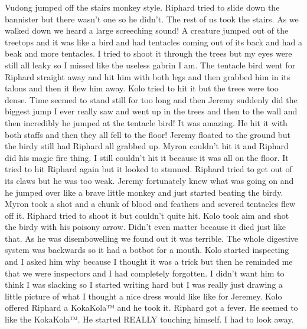 \begin{multicols}{2}
Vudong jumped off the stairs monkey style. Riphard tried to slide down the bannister but there wasn’t one so he didn’t. The rest of us took the stairs. As we walked down we heard a large screeching sound! A creature jumped out of the treetops and it was like a bird and had tentacles coming out of its back and had a beak and more tentacles. I tried to shoot it through the trees but my eyes were still all leaky so I missed like the useless gabrin I am. The tentacle bird went for Riphard straight away and hit him with both legs and then grabbed him in its talons and then it flew him away. Kolo tried to hit it but the trees were too dense. Time seemed to stand still for too long and then Jeremy suddenly did the biggest jump I ever really saw and went up in the trees and then to the wall and then incredibly he jumped at the tentacle bird! It was amazing. He hit it with both staffs and then they all fell to the floor! Jeremy floated to the ground but the birdy still had Riphard all grabbed up. Myron couldn’t hit it and Riphard did his magic fire thing. I still couldn’t hit it because it was all on the floor. It tried to hit Riphard again but it looked to stunned. Riphard tried to get out of its claws but he was too weak. Jeremy fortunately knew what was going on and he jumped over like a brave little monkey and just started beating the birdy. Myron took a shot and a chunk of blood and feathers and severed tentacles flew off it. Riphard tried to shoot it but couldn’t quite hit. Kolo took aim and shot the birdy with his poisony arrow. Didn’t even matter because it died just like that. As he was disembowelling we found out it was terrible. The whole digestive system was backwards so it had a botbot for a mouth. Kolo started inspecting and I asked him why because I thought it was a trick but then he reminded me that we were inspectors and I had completely forgotten. I didn’t want him to think I was slacking so I started writing hard but I was really just drawing a little picture of what I thought a nice dress would like like for Jeremey. Kolo offered Riphard a KokaKola™ and he took it. Riphard got a fever. He seemed to like the KokaKola™. He started REALLY touching himself. I had to look away.\medskip


\end{multicols}
